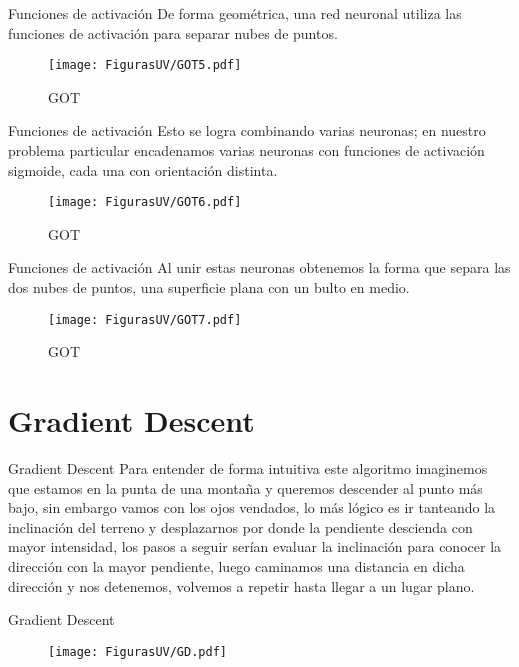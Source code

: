 \documentclass[10pt]{beamer}
\begin{document}
\begin{frame}{Funciones de activación}
De forma geométrica, una red neuronal utiliza las funciones de activación para separar nubes de puntos.

\begin{figure}[h!]
  \centering
  \texttt{[image: FigurasUV/GOT5.pdf]}
  \caption{GOT}
\end{figure}

\end{frame}

\begin{frame}{Funciones de activación}
Esto se logra combinando varias neuronas; en nuestro problema particular encadenamos varias neuronas con funciones de activación sigmoide, cada una con orientación distinta. 

\begin{figure}[h!]
  \centering
  \texttt{[image: FigurasUV/GOT6.pdf]}
  \caption{GOT}
\end{figure}


\end{frame}

\begin{frame}{Funciones de activación}
Al unir estas neuronas obtenemos la forma que separa las dos nubes de puntos, una superficie plana con un bulto en medio.


\begin{figure}[h!]
  \centering
  \texttt{[image: FigurasUV/GOT7.pdf]}
  \caption{GOT}
\end{figure}

\end{frame}
\section{Gradient Descent}
\begin{frame}{Gradient Descent}
Para entender de forma intuitiva este algoritmo imaginemos que estamos en la punta de una montaña y queremos descender al punto más bajo, sin embargo vamos con los ojos vendados, lo más lógico es ir tanteando la inclinación del terreno y desplazarnos por donde la pendiente descienda con mayor intensidad, los pasos a seguir serían evaluar la inclinación para conocer la dirección con la mayor pendiente, luego caminamos una distancia en dicha dirección y
nos detenemos, volvemos a repetir hasta llegar a un lugar plano.
\end{frame}

\begin{frame}{Gradient Descent}
\begin{figure}[h!]
  \centering
  \texttt{[image: FigurasUV/GD.pdf]}
  \end{figure}
\end{frame}
\end{document}
